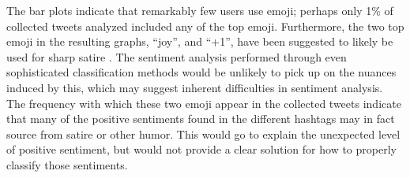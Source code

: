 \documentclass[prodmode]{acmsmall} %
\begin{document}
The bar plots indicate that remarkably few users use emoji; perhaps only 1\% of
collected tweets analyzed included any of the top emoji. Furthermore, the two
top emoji in the resulting graphs, ``joy'', and ``+1'', have been suggested to
likely be used for sharp satire \cite{emoji}. The sentiment analysis performed
through even sophisticated classification methods would be unlikely to pick up
on the nuances induced by this, which may suggest inherent difficulties in
sentiment analysis. The frequency with which these two emoji appear in the
collected tweets indicate that many of the positive sentiments found in the
different hashtags may in fact source from satire or other humor. This would go
to explain the unexpected level of positive sentiment, but would not provide a
clear solution for how to properly classify those sentiments.
\end{document}
